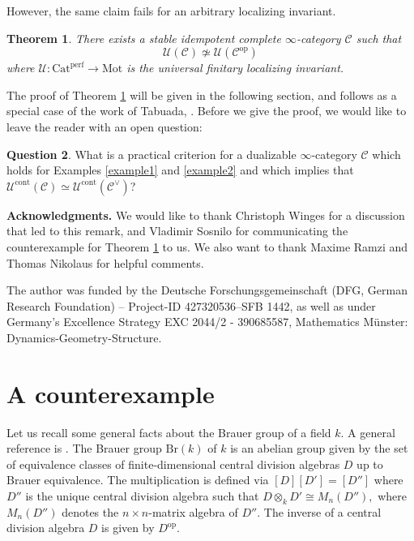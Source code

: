 \documentclass[10pt]{amsart}
\newtheorem{theorem}{Theorem}
\theoremstyle{definition}
\newtheorem{question}[theorem]{Question}
\newcommand{\Cat}{\mathrm{Cat}}
\newcommand{\perf}{\mathrm{perf}}
\newcommand{\cont}{\mathrm{cont}}
\newcommand{\op}{\mathrm{op}}
\begin{document}
However, the same claim fails for an arbitrary localizing invariant.

\begin{theorem} \label{noninvariance}
There exists a stable idempotent complete $\infty$-category $\mathcal{C}$ such that
\[ \mathcal{U}( \mathcal{C} ) \not\simeq \mathcal{U}( \mathcal{C}^{\op} )\]
where $\mathcal{U} : \Cat^\perf \rightarrow \mathrm{Mot}$ is the universal finitary localizing invariant.
\end{theorem}

The proof of Theorem \ref{noninvariance} will be given in the following section, and follows as a special case of the work of Tabuada, \cite{Tabuada2014Additive}. Before we give the proof, we would like to leave the reader with an open question:

\begin{question}
What is a practical criterion for a dualizable $\infty$-category $\mathcal{C}$ which holds for Examples \ref{example1} and \ref{example2} and which implies that $\mathcal{U}^{\cont}( \mathcal{C} ) \simeq \mathcal{U}^{\cont}( \mathcal{C}^\vee )$?
\end{question}

\noindent \textbf{Acknowledgments.} 
We would like to thank Christoph Winges for a discussion that led to this remark, and Vladimir Sosnilo for communicating the counterexample for Theorem \ref{noninvariance} to us. We also want to thank Maxime Ramzi and Thomas Nikolaus for helpful comments.

The author was funded by the Deutsche Forschungsgemeinschaft (DFG, German Research Foundation) – Project-ID 427320536–SFB 1442, as well as under Germany's Excellence Strategy EXC 2044/2 - 390685587, Mathematics Münster: Dynamics-Geometry-Structure.

\section*{A counterexample}

Let us recall some general facts about the Brauer group of a field $k$. A general reference is \cite[Section 2.4]{GilleSzamuely2006}. The Brauer group $\mathrm{Br}(k)$ of $k$ is an abelian group given by the set of equivalence classes of finite-dimensional central division algebras $D$ up to Brauer equivalence. The multiplication is defined via $[D][D'] = [D'']$ where $D''$ is the unique central division algebra such that
$ D \otimes_k D' \cong M_{n}(D''),$ where $M_{n}(D'')$ denotes the $n \times n$-matrix algebra of $D''$. The inverse of a central division algebra $D$ is given by $D^{\op}$.
\end{document}
